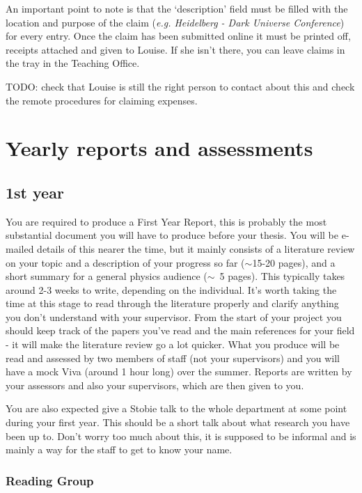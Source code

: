 An important point to note is that the `description' field must be filled with the location and purpose of the claim
(\emph{e.g. Heidelberg - Dark Universe Conference}) for every entry.
Once the claim has been submitted online it must be printed off,
receipts attached and given to Louise. If she isn't there, you can leave claims in the tray in the Teaching Office.

TODO: check that Louise is still the right person to contact about this and check the remote procedures for claiming expenses.

\section{Yearly reports and assessments}

\subsection{1st year}

You are required to produce a First Year Report, this is probably the most substantial
document you will have to produce before your thesis. You will be
e-mailed details of this nearer the time, but it mainly consists of a literature review on your topic and a description of your progress so far (\(\sim\)15-20 pages), and a short summary for a general physics audience (\(\sim\)~5 pages). This typically takes around 2-3 weeks to write, depending on the individual. It's worth taking the time at this stage to read through the literature properly and clarify anything you don't understand with your supervisor. From the start of your project you should keep track of the papers you've read and the main references for your field - it will make the literature review go a lot quicker. What you produce will be read and assessed by two members of staff 
(not your supervisors) and you will have a mock Viva (around 1 hour long) over the summer.
Reports are written by your assessors and also your supervisors, which
are then given to you.

You are also expected give a Stobie talk to the whole department at some point during your first year.
This should be a short talk about what research you
have been up to.  Don't worry too much about this, it is supposed to
be informal and is mainly a way for the staff to get to know your
name.

\subsubsection{Reading Group}

